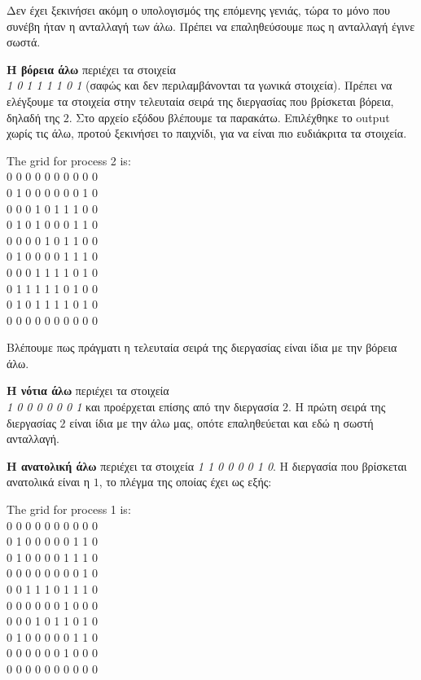 \begin{multicols}{2}
Δεν έχει ξεκινήσει ακόμη ο υπολογισμός της επόμενης γενιάς, τώρα το μόνο που συνέβη ήταν η ανταλλαγή των άλω. Πρέπει να επαληθεύσουμε πως η ανταλλαγή έγινε σωστά. \par

\textbf{Η βόρεια άλω} περιέχει τα στοιχεία \\ \emph{1 0 1 1 1 1 0 1} (σαφώς και δεν περιλαμβάνονται τα γωνικά στοιχεία). Πρέπει να ελέγξουμε τα στοιχεία στην τελευταία σειρά της διεργασίας που βρίσκεται βόρεια, δηλαδή της $2$. Στο αρχείο εξόδου βλέπουμε τα παρακάτω. Επιλέχθηκε το output χωρίς τις άλω, προτού ξεκινήσει το παιχνίδι, για να είναι πιο ευδιάκριτα τα στοιχεία. 
\begin{tcolorbox}
The grid for process 2 is: \\
0 0 0 0 0 0 0 0 0 0 \\
0 1 0 0 0 0 0 0 1 0 \\
0 0 0 1 0 1 1 1 0 0 \\
0 1 0 1 0 0 0 1 1 0 \\
0 0 0 0 1 0 1 1 0 0 \\
0 1 0 0 0 0 1 1 1 0 \\
0 0 0 1 1 1 1 0 1 0 \\
0 1 1 1 1 1 0 1 0 0 \\
0 1 0 1 1 1 1 0 1 0 \\
0 0 0 0 0 0 0 0 0 0 \\
\end{tcolorbox}
Βλέπουμε πως πράγματι η τελευταία σειρά της διεργασίας είναι ίδια με την βόρεια άλω. \par
\textbf{Η νότια άλω} περιέχει τα στοιχεία \\ \emph{1 0 0 0 0 0 0 1} και προέρχεται επίσης από την διεργασία $2$. Η πρώτη σειρά της διεργασίας $2$ είναι ίδια με την άλω μας, οπότε επαληθεύεται και εδώ η σωστή ανταλλαγή. \par
\textbf{Η ανατολική άλω} περιέχει τα στοιχεία \emph{1 1 0 0 0 0 1 0}. Η διεργασία που βρίσκεται ανατολικά είναι η $1$, το πλέγμα της οποίας έχει ως εξής:

\begin{tcolorbox}
The grid for process 1 is: \\
0 0 0 0 0 0 0 0 0 0 \\
0 1 0 0 0 0 0 1 1 0 \\
0 1 0 0 0 0 1 1 1 0 \\
0 0 0 0 0 0 0 0 1 0 \\
0 0 1 1 1 0 1 1 1 0 \\
0 0 0 0 0 0 1 0 0 0 \\
0 0 0 1 0 1 1 0 1 0 \\
0 1 0 0 0 0 0 1 1 0 \\
0 0 0 0 0 0 1 0 0 0 \\
0 0 0 0 0 0 0 0 0 0 \\
\end{tcolorbox}


\end{multicols}
